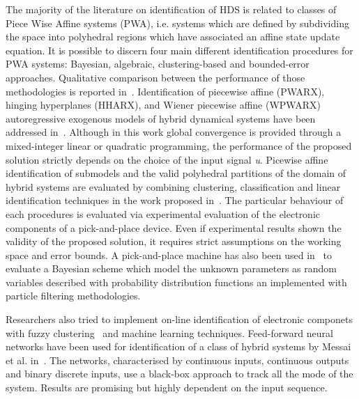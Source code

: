 The majority of the literature on identification of HDS is related to classes of Piece Wise Affine systems (PWA), i.e. systems which are defined by subdividing the  space into polyhedral regions which have associated an affine state update equation.
It is possible to discern four main different identification procedures for PWA systems: Bayesian, algebraic, clustering-based and bounded-error approaches. Qualitative comparison between the performance of those methodologies is reported in~\cite{Juloski,Paoletti}.
Identification of piecewise affine (PWARX), hinging hyperplanes (HHARX), and Wiener piecewise affine (WPWARX) autoregressive exogenous models of hybrid dynamical systems have been addressed in~\cite{Bemporad}. Although in this work global convergence is provided through a mixed-integer linear or quadratic programming, the performance of the proposed solution strictly depends on the choice of the input signal \textit{u}. 
Picewise affine identification of submodels and the valid polyhedral partitions of the domain of hybrid systems are evaluated by combining clustering, classification and linear identification techniques in the work proposed in~\cite{Ferrari}. 
The particular behaviour of each procedures is evaluated via experimental evaluation of the electronic components of a pick-and-place device. Even if experimental results shown the validity of the proposed solution, it requires strict assumptions on the working space and error bounds.
A pick-and-place machine has also been used in~\cite{juloski2005bayesian} to evaluate a Bayesian scheme which model the unknown parameters as random variables described with probability distribution functions an implemented with particle filtering methodologies. 

Researchers also tried to implement on-line identification of electronic componets with fuzzy clustering~\cite{sepasi2008line} and machine learning techniques.
Feed-forward neural networks have been used for identification of a class of hybrid systems by Messai et al. in~\cite{Messai,MESSAI2006217}. The networks, characterised by continuous inputs, continuous outputs and binary discrete inputs, use a black-box approach to track all the mode of the system. Results are promising but highly dependent on the input sequence.

